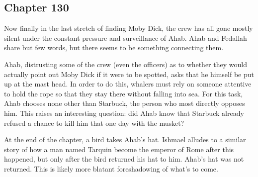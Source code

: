 \subsection{Chapter 130}

Now finally in the last stretch of finding Moby Dick, the crew has all gone
mostly silent under the constant pressure and surveillance of Ahab. Ahab and
Fedallah share but few words, but there seems to be something connecting them.

Ahab, distrusting some of the crew (even the officers) as to whether they would
actually point out Moby Dick if it were to be spotted, asks that he himself be
put up at the mast head. In order to do this, whalers must rely on someone
attentive to hold the rope so that they stay there without falling into sea.
For this task, Ahab chooses none other than Starbuck, the person who most
directly opposes him. This raises an interesting question: did Ahab know that
Starbuck already refused a chance to kill him that one day with the musket?

At the end of the chapter, a bird takes Ahab's hat. Ishmael alludes to a
similar story of how a man named Tarquin become the emperor of Rome after this
happened, but only after the bird returned his hat to him. Ahab's hat was not
returned. This is likely more blatant foreshadowing of what's to come.
